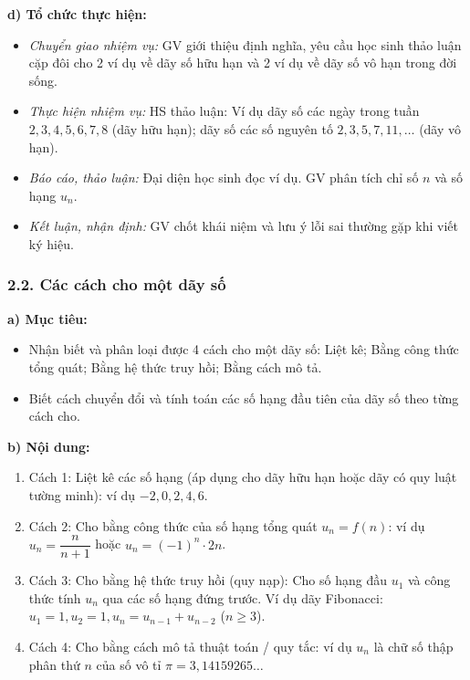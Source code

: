 \documentclass[12pt, a4paper]{article}
\begin{document}
\noindent \textbf{d) Tổ chức thực hiện:}  
\begin{itemize}[leftmargin=0.8cm]  
    \item \textit{Chuyển giao nhiệm vụ:} GV giới thiệu định nghĩa, yêu cầu học sinh thảo luận cặp đôi cho 2 ví dụ về dãy số hữu hạn và 2 ví dụ về dãy số vô hạn trong đời sống.  
    \item \textit{Thực hiện nhiệm vụ:} HS thảo luận: Ví dụ dãy số các ngày trong tuần $2, 3, 4, 5, 6, 7, 8$ (dãy hữu hạn); dãy số các số nguyên tố $2, 3, 5, 7, 11, \dots$ (dãy vô hạn).  
    \item \textit{Báo cáo, thảo luận:} Đại diện học sinh đọc ví dụ. GV phân tích chỉ số $n$ và số hạng $u_n$.  
    \item \textit{Kết luận, nhận định:} GV chốt khái niệm và lưu ý lỗi sai thường gặp khi viết ký hiệu.  
\end{itemize}  
  
\subsubsection*{2.2. Các cách cho một dãy số}  
  
\noindent \textbf{a) Mục tiêu:}  
\begin{itemize}[leftmargin=0.8cm]  
    \item Nhận biết và phân loại được 4 cách cho một dãy số: Liệt kê; Bằng công thức tổng quát; Bằng hệ thức truy hồi; Bằng cách mô tả.  
    \item Biết cách chuyển đổi và tính toán các số hạng đầu tiên của dãy số theo từng cách cho.  
\end{itemize}  
  
\noindent \textbf{b) Nội dung:}  
\begin{enumerate}[leftmargin=0.6cm]  
    \item Cách 1: Liệt kê các số hạng (áp dụng cho dãy hữu hạn hoặc dãy có quy luật tường minh): ví dụ $-2, 0, 2, 4, 6$.  
    \item Cách 2: Cho bằng công thức của số hạng tổng quát $u_n = f(n)$: ví dụ $u_n = \dfrac{n}{n + 1}$ hoặc $u_n = (-1)^n \cdot 2n$.  
    \item Cách 3: Cho bằng hệ thức truy hồi (quy nạp): Cho số hạng đầu $u_1$ và công thức tính $u_n$ qua các số hạng đứng trước. Ví dụ dãy Fibonacci: $u_1 = 1, u_2 = 1, u_n = u_{n-1} + u_{n-2}$ ($n \ge 3$).  
    \item Cách 4: Cho bằng cách mô tả thuật toán / quy tắc: ví dụ $u_n$ là chữ số thập phân thứ $n$ của số vô tỉ $\pi = 3{,}14159265\dots$  
\end{enumerate}  
  
\end{document}
